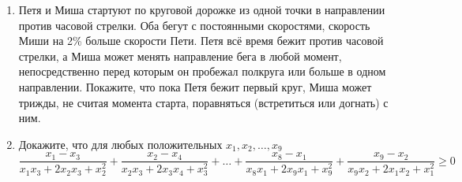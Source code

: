 \documentclass{article}
\begin{document}
\begin{enumerate}[label*=\protect\fbox{\arabic{enumi}}]
\item Петя и Миша стартуют по круговой дорожке из одной точки в направлении против часовой стрелки. Оба бегут с постоянными скоростями, скорость Миши на 2\% больше скорости Пети. Петя всё время бежит против часовой стрелки, а Миша может менять направление бега в любой момент, непосредственно перед которым он пробежал полкруга или больше в одном направлении. Покажите, что пока Петя бежит первый круг, Миша может трижды, не считая момента старта, поравняться (встретиться или догнать) с ним.

\item Докажите, что для любых положительных $x_1, x_2, \dotsc , x_9$ 
$$\frac{x_1 - x_3}{x_1x_3 + 2x_2x_3 + x_2^2} + \frac{x_2 - x_4}{x_2x_3 + 2x_3x_4 + x_3^2} + \dotsc + \frac{x_8 - x_1}{x_8x_1 + 2x_9x_1 + x_9^2} + \frac{x_9 - x_2}{x_9x_2 + 2x_1x_2 + x_1^2} \geqslant 0$$

\end{enumerate}
\end{document}
